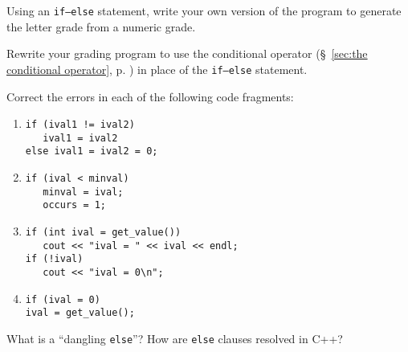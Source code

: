 %
%
\begin{question}
Using an \verb|if–else| statement, write your own version of the
program to generate the letter grade from a numeric grade.
\end{question}

\begin{question}
Rewrite your grading program to use the conditional operator
(\S~\ref{sec:the conditional operator}, p. \pageref{sec:the conditional operator}) in place of the \verb|if–else| statement.
\end{question}

\begin{question}
Correct the errors in each of the following code fragments:
\begin{enumerate}[label=(\alph*)]
^^I\item
\begin{lstlisting}
if (ival1 != ival2)
   ival1 = ival2
else ival1 = ival2 = 0;
\end{lstlisting}

^^I\item
\begin{lstlisting}
if (ival < minval)
   minval = ival;
   occurs = 1;
\end{lstlisting}

^^I\item
\begin{lstlisting}
if (int ival = get_value())
   cout << "ival = " << ival << endl;
if (!ival)
   cout << "ival = 0\n";
\end{lstlisting}

^^I\item
\begin{lstlisting}
if (ival = 0)
ival = get_value();
\end{lstlisting}
\end{enumerate}
\end{question}

\begin{question}
What is a “dangling \verb|else|”? How are \verb|else| clauses resolved in C++?
\end{question}
